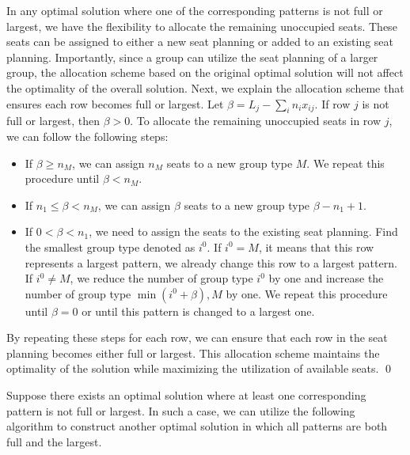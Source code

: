\begin{pf}
In any optimal solution where one of the corresponding patterns is not full or largest, we have the flexibility to allocate the remaining unoccupied seats. These seats can be assigned to either a new seat planning or added to an existing seat planning. Importantly, since a group can utilize the seat planning of a larger group, the allocation scheme based on the original optimal solution will not affect the optimality of the overall solution. Next, we explain the allocation scheme that ensures each row becomes full or largest. Let $\beta= L_{j} - \sum_{i} n_{i} x_{ij}$. If row $j$ is not full or largest, then $\beta > 0$. 
To allocate the remaining unoccupied seats in row $j$, we can follow the following steps:

\begin{itemize}
  \item If $\beta \geq n_{M}$, we can assign $n_M$ seats to a new group type $M$. We repeat this procedure until $\beta < n_{M}$. 
  \item If $n_{1} \leq \beta < n_{M}$, we can assign $\beta$ seats to a new group type $\beta-n_{1}+1$.   
  \item If $0 < \beta < n_{1}$, we need to assign the seats to the existing seat planning. Find the smallest group type denoted as $i^0$. If $i^0 = M$, it means that this row represents a largest pattern, we already change this row to a largest pattern. If $i^0 \neq M$, we reduce the number of group type $i^0$ by one and increase the number of group type $\min {(i^0+\beta), M}$ by one. We repeat this procedure until $\beta = 0$ or until this pattern is changed to a largest one.
\end{itemize}

By repeating these steps for each row, we can ensure that each row in the seat planning becomes either full or largest. This allocation scheme maintains the optimality of the solution while maximizing the utilization of available seats. \qed
\end{pf}



Suppose there exists an optimal solution where at least one corresponding pattern is not full or largest. In such a case, we can utilize the following algorithm to construct another optimal solution in which all patterns are both full and the largest.


